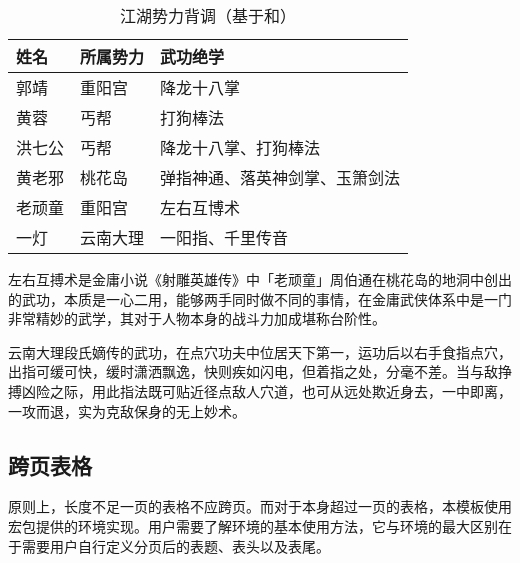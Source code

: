\documentclass[doctor, vlined]{DissertUESTC}
\begin{document}
	\begin{table}[!ht]
		\caption{江湖势力背调（基于和）} \label{tab: 江湖势力背调（基于puttablenotelabel和tablenoteref）}
		\begin{threeparttable}
			\begin{tabular}{p{2cm} p{3cm} p{7cm}}
				\toprule
				\textbf{姓名} & \textbf{所属势力} & \textbf{武功绝学} \\
				\midrule
				郭靖 & 重阳宫 & 降龙十八掌 \\
				黄蓉 & 丐帮 & 打狗棒法 \\
				洪七公 & 丐帮 & 降龙十八掌、打狗棒法 \\
				黄老邪 & 桃花岛 & 弹指神通、落英神剑掌、玉箫剑法 \\
				老顽童 & 重阳宫 & 左右互博术\tablenoteref{tn: 左右互搏术} \\
				一灯 & 云南大理 & 一阳指\tablenoteref{tn: 一阳指}、千里传音 \\
				\bottomrule
			\end{tabular}
			\begin{tablenotes}
				\item[\puttablenotelabel{tn: 左右互搏术}] 左右互搏术是金庸小说《射雕英雄传》中「老顽童」周伯通在桃花岛的地洞中创出的武功，本质是一心二用，能够两手同时做不同的事情，在金庸武侠体系中是一门非常精妙的武学，其对于人物本身的战斗力加成堪称台阶性。
				\item[\puttablenotelabel{tn: 一阳指}] 云南大理段氏嫡传的武功，在点穴功夫中位居天下第一，运功后以右手食指点穴，出指可缓可快，缓时潇洒飘逸，快则疾如闪电，但着指之处，分毫不差。当与敌挣搏凶险之际，用此指法既可贴近径点敌人穴道，也可从远处欺近身去，一中即离，一攻而退，实为克敌保身的无上妙术。
			\end{tablenotes}
		\end{threeparttable}
	\end{table}
	
	
	\clearpage
	\subsection{跨页表格}
	
	原则上，长度不足一页的表格不应跨页。而对于本身超过一页的表格，本模板使用\href{https://mirrors.tuna.tsinghua.edu.cn/CTAN/macros/latex/required/tools/longtable.pdf}{\ttfamily\color{DarkRed}}宏包提供的环境实现。用户需要了解环境的基本使用方法，它与环境的最大区别在于需要用户自行定义分页后的表题、表头以及表尾。
	
\end{document}
